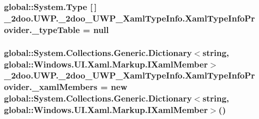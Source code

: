 \hypertarget{class__2doo_1_1_u_w_p_1_1__2doo___u_w_p___xaml_type_info_1_1_xaml_type_info_provider_067fa855f3c19999ccb575fcedfe5d50}{
\subsubsection[{\_\-typeTable}]{\setlength{\rightskip}{0pt plus 5cm}global::System.Type \mbox{[}$\,$\mbox{]} {\bf \_\-2doo.UWP.\_\-2doo\_\-UWP\_\-XamlTypeInfo.XamlTypeInfoProvider.\_\-typeTable} = null}}
\label{class__2doo_1_1_u_w_p_1_1__2doo___u_w_p___xaml_type_info_1_1_xaml_type_info_provider_067fa855f3c19999ccb575fcedfe5d50}


\hypertarget{class__2doo_1_1_u_w_p_1_1__2doo___u_w_p___xaml_type_info_1_1_xaml_type_info_provider_18564e6328553bb07be6bb74e7b33eae}{
\subsubsection[{\_\-xamlMembers}]{\setlength{\rightskip}{0pt plus 5cm}global::System.Collections.Generic.Dictionary$<$string, global::Windows.UI.Xaml.Markup.IXamlMember$>$ {\bf \_\-2doo.UWP.\_\-2doo\_\-UWP\_\-XamlTypeInfo.XamlTypeInfoProvider.\_\-xamlMembers} = new global::System.Collections.Generic.Dictionary$<$string, global::Windows.UI.Xaml.Markup.IXamlMember$>$()}}
\label{class__2doo_1_1_u_w_p_1_1__2doo___u_w_p___xaml_type_info_1_1_xaml_type_info_provider_18564e6328553bb07be6bb74e7b33eae}


